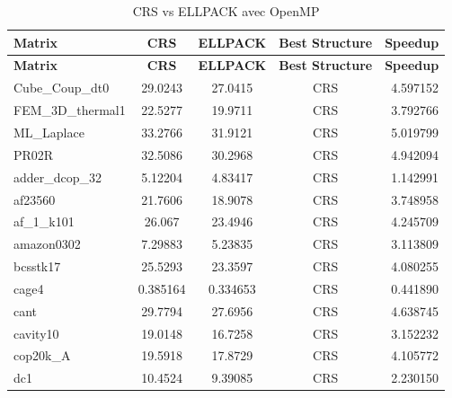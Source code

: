 \documentclass[12pt,oneside]{book} %
\begin{document}
\newpage
\begin{longtable}{lcccr}
    \caption{CRS vs ELLPACK avec OpenMP}                                                             \\
    \toprule
    \textbf{Matrix}   & \textbf{CRS} & \textbf{ELLPACK} & \textbf{Best Structure} & \textbf{Speedup} \\
    \midrule
    \endfirsthead
    \toprule
    \textbf{Matrix}   & \textbf{CRS} & \textbf{ELLPACK} & \textbf{Best Structure} & \textbf{Speedup} \\
    \midrule
    \endhead
    \bottomrule
    \endfoot
    Cube\_Coup\_dt0   & 29.0243      & 27.0415          & CRS                     & 4.597152         \\
    FEM\_3D\_thermal1 & 22.5277      & 19.9711          & CRS                     & 3.792766         \\
    ML\_Laplace       & 33.2766      & 31.9121          & CRS                     & 5.019799         \\
    PR02R             & 32.5086      & 30.2968          & CRS                     & 4.942094         \\
    adder\_dcop\_32   & 5.12204      & 4.83417          & CRS                     & 1.142991         \\
    af23560           & 21.7606      & 18.9078          & CRS                     & 3.748958         \\
    af\_1\_k101       & 26.067       & 23.4946          & CRS                     & 4.245709         \\
    amazon0302        & 7.29883      & 5.23835          & CRS                     & 3.113809         \\
    bcsstk17          & 25.5293      & 23.3597          & CRS                     & 4.080255         \\
    cage4             & 0.385164     & 0.334653         & CRS                     & 0.441890         \\
    cant              & 29.7794      & 27.6956          & CRS                     & 4.638745         \\
    cavity10          & 19.0148      & 16.7258          & CRS                     & 3.152232         \\
    cop20k\_A         & 19.5918      & 17.8729          & CRS                     & 4.105772         \\
    dc1               & 10.4524      & 9.39085          & CRS                     & 2.230150         \\

\end{longtable}
\end{document}

